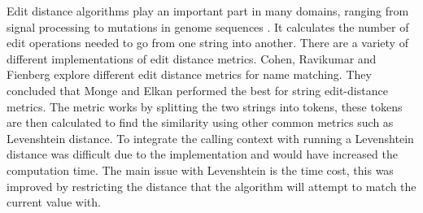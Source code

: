 Edit distance algorithms play an important part in many domains, ranging from signal processing to mutations in genome sequences \cite{navarro2001guided}. It calculates the number of edit operations needed to go from one string into another. There are a variety of different implementations of edit distance metrics. Cohen, Ravikumar and Fienberg \cite{cohen2003comparison} explore different edit distance metrics for name matching. They concluded that Monge and Elkan performed the best for string edit-distance metrics. The metric works by splitting the two strings into tokens, these tokens are then calculated to find the similarity using other common metrics such as Levenshtein distance. To integrate the calling context with running a Levenshtein distance was difficult due to the implementation and would have increased the computation time. The main issue with Levenshtein is the time cost, this was improved by restricting the distance that the algorithm will attempt to match the current value with.